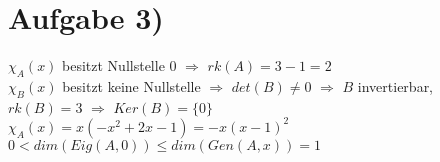 \documentclass[a4paper]{article}
\begin{document}
\section*{Aufgabe 3)}
\(\chi_A(x)\) besitzt Nullstelle 0 \(\Rightarrow\) \(rk(A)=3-1=2\)\\
\(\chi_B(x)\) besitzt keine Nullstelle \(\Rightarrow\) \(det(B)\neq 0\) \(\Rightarrow\) \(B\) invertierbar, \(rk(B)=3\) \(\Rightarrow\) \(Ker(B)=\{0\}\)\\
\(\chi_A(x)=x(-x^2+2x-1)=-x(x-1)^2\)\\
\(0<dim(Eig(A,0))\leq dim(Gen(A,x))=1\)
\end{document}

